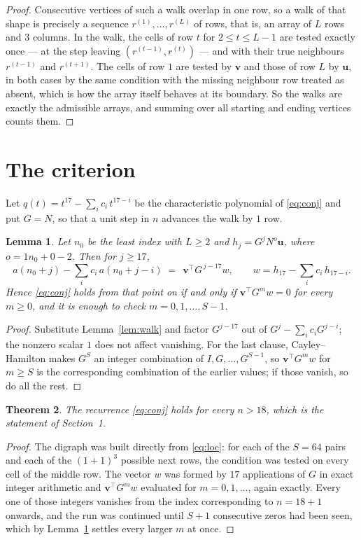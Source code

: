 \documentclass[11pt,a4paper]{article}
\theoremstyle{plain}
\newtheorem{theorem}{Theorem}
\newtheorem{lemma}[theorem]{Lemma}
\theoremstyle{definition}
\begin{document}
\begin{proof}
Consecutive vertices of such a walk overlap in one row, so a walk of that shape is
precisely a sequence $r^{(1)},\dots,r^{(L)}$ of rows, that is, an array of $L$ rows
and $3$ columns. In the walk, the cells of row $t$ for $2\le t\le L-1$ are tested
exactly once --- at the step leaving $(r^{(t-1)},r^{(t)})$ --- and with their true
neighbours $r^{(t-1)}$ and $r^{(t+1)}$. The cells of row $1$ are tested by
$\mathbf{v}$ and those of row $L$ by $\mathbf{u}$, in both cases by the same condition
with the missing neighbour row treated as absent, which is how the array itself behaves at
its boundary. So the walks are exactly the admissible arrays, and summing over all starting
and ending vertices counts them.
\end{proof}

\section{The criterion}

Let $q(t)=t^{17}-\sum_i c_i\,t^{17-i}$ be the characteristic polynomial of
\eqref{eq:conj} and put $G=N$, so that a unit step in $n$ advances the walk by
$1$ row.

\begin{lemma}\label{lem:crit}
Let $n_0$ be the least index with $L\ge2$ and $h_j=G^{j}N^{o}\mathbf{u}$, where
$o=1n_0+0-2$. Then for $j\ge17$,
\[
a(n_0+j)-\sum_i c_i\,a(n_0+j-i)\;=\;\,\mathbf{v}^{\!\top}G^{\,j-17}w,
\qquad w=h_{17}-\sum_i c_i\,h_{17-i} .
\]
Hence \eqref{eq:conj} holds from that point on if and only if
$\mathbf{v}^{\!\top}G^{m}w=0$ for every $m\ge0$, and it is enough to check
$m=0,1,\dots,S-1$.
\end{lemma}

\begin{proof}
Substitute Lemma~\ref{lem:walk} and factor $G^{j-17}$ out of
$G^{j}-\sum_ic_iG^{j-i}$; the nonzero scalar $1$ does not affect
vanishing. For the last clause, Cayley--Hamilton makes $G^{S}$ an integer combination of
$I,G,\dots,G^{S-1}$, so $\mathbf{v}^{\!\top}G^{m}w$ for $m\ge S$ is the corresponding
combination of the earlier values; if those vanish, so do all the rest.
\end{proof}

\begin{theorem}
The recurrence \eqref{eq:conj} holds for every $n>18$, which is the statement of
Section~1.
\end{theorem}

\begin{proof}
The digraph was built directly from \eqref{eq:loc}: for each of the $S=64$ pairs and each
of the $(1+1)^{3}$ possible next rows, the condition was tested on every cell of
the middle row. The vector $w$ was formed by $17$ applications of $G$ in exact integer
arithmetic and $\mathbf{v}^{\!\top}G^{m}w$ evaluated for $m=0,1,\dots$, again exactly.
Every one of those integers vanishes from the index corresponding to $n=18+1$ onwards,
and the run was continued until $S+1$ consecutive zeros had been seen, which by
Lemma~\ref{lem:crit} settles every larger $m$ at once.
\end{proof}
\end{document}

